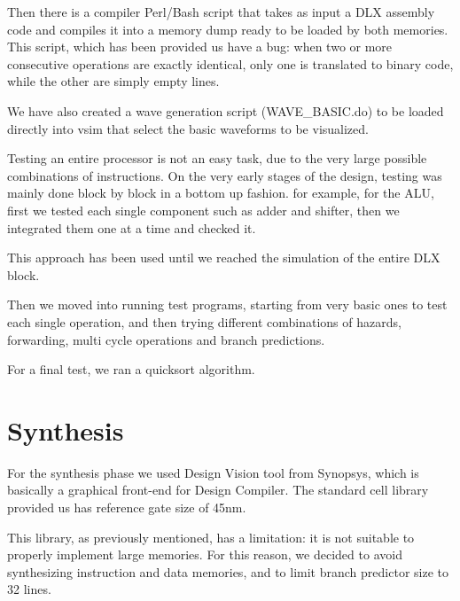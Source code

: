 \documentclass[12pt]{article}
\begin{document}
Then there is a compiler Perl/Bash script that takes as input a DLX assembly code and compiles it into a memory dump ready to be loaded by both memories.
This script, which has been provided us have a bug: when two or more consecutive operations are exactly identical, only one is translated to binary code, while the other are simply empty lines.

We have also created a wave generation script (WAVE\_BASIC.do) to be loaded directly into vsim that select the basic waveforms to be visualized.

Testing an entire processor is not an easy task, due to the very large possible combinations of instructions.
On the very early stages of the design, testing was mainly done block by block in a bottom up fashion. for example, for the ALU, first we tested each single component such as adder and shifter, then we integrated them one at a time and checked it.

This approach has been used until we reached the simulation of the entire DLX block.


Then we moved into running test programs, starting from very basic ones to test each single operation, and then trying different combinations of hazards, forwarding, multi cycle operations and branch predictions.

For a final test, we ran a quicksort algorithm.


\section{Synthesis}\label{Synthesis}
For the synthesis phase we used Design Vision tool from Synopsys, which is basically a graphical front-end for Design Compiler.
The standard cell library provided us has reference gate size of 45nm.

This library, as previously mentioned, has a limitation: it is not suitable to properly implement large memories.
For this reason, we decided to avoid synthesizing instruction and data memories, and to limit branch predictor size to 32 lines.
\end{document}
